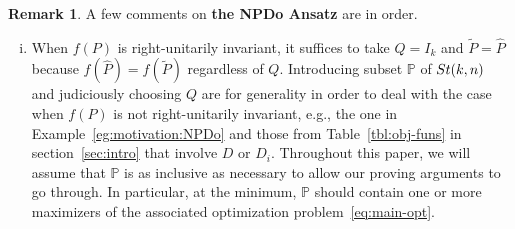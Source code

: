 \documentclass[11pt]{article}
\def\bbP{\mathbb{P}}
\def\scrH{\mathscr{H}}
\def\wtd{\widetilde}
\def\what{\widehat}
\newcommand\STM[2]{{\rm St}(#1,#2)}
\DeclareMathOperator{\tr}{tr}
\DeclareMathOperator{\T}{T}
\def\Blue{\textcolor{blue}}
\theoremstyle{definition}
\newtheorem{remark}{Remark}[section]
\numberwithin{equation}{section}
\begin{document}
\begin{remark}\label{rk:NPDo-assume}
A few comments on {\bf the NPDo Ansatz} are in order.
\begin{enumerate}[(i)]


  \item When $f(P)$ is right-unitarily invariant,
        it suffices to take $Q=I_k$ and $\wtd P=\what P$ because $f(\what P)=f(\wtd P)$
        regardless of $Q$.
        Introducing subset $\bbP$ of $\STM{k}{n}$ and judiciously choosing $Q$
        are for generality in order to deal with the case when $f(P)$
        is not right-unitarily invariant, e.g., the one in Example~\ref{eg:motivation:NPDo} and those from  Table~\ref{tbl:obj-funs} in section~\ref{sec:intro} that involve
        $D$ or $D_i$.
        Throughout this paper, we will assume that $\bbP$ is
        as inclusive as necessary to allow our proving arguments to go through. In particular, at the minimum, $\bbP$ should contain one or more maximizers of the associated optimization problem~\eqref{eq:main-opt}.


\end{enumerate}
\end{remark}
\end{document}
